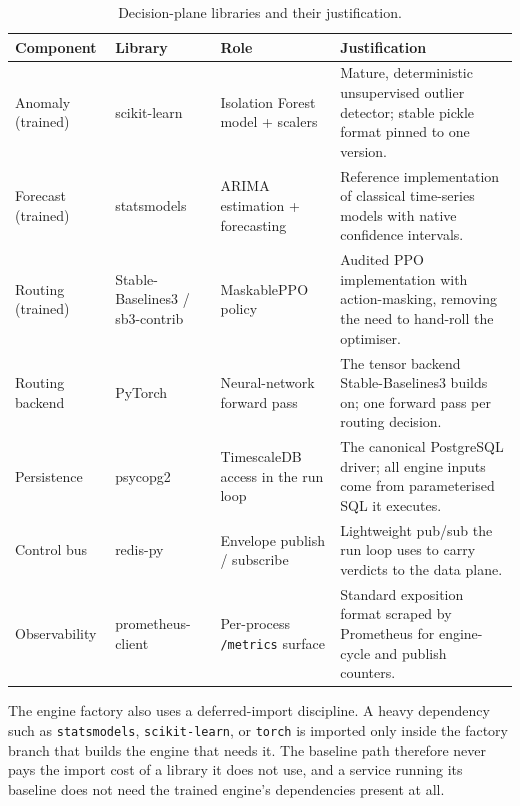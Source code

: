 \begin{table}[H]
  \centering
  \caption[Decision-plane libraries and their justification]{Decision-plane libraries and their justification.}
  \label{tab:imb:tooling}
  \small
  \begin{tabular}{@{}llp{3.0cm}p{4.4cm}@{}}
    \toprule
    \textbf{Component} & \textbf{Library} & \textbf{Role} & \textbf{Justification} \\
    \midrule
    Anomaly (trained)  & scikit-learn        & Isolation Forest model + scalers
      & Mature, deterministic unsupervised outlier detector; stable pickle format pinned to one version. \\
    Forecast (trained) & statsmodels         & ARIMA estimation + forecasting \cite{box2015timeseries}
      & Reference implementation of classical time-series models with native confidence intervals. \\
    Routing (trained)  & Stable-Baselines3 / sb3-contrib & MaskablePPO policy \cite{schulman2017ppo, raffin2021sb3}
      & Audited PPO implementation with action-masking, removing the need to hand-roll the optimiser. \\
    Routing backend    & PyTorch             & Neural-network forward pass
      & The tensor backend Stable-Baselines3 builds on; one forward pass per routing decision. \\
    Persistence        & psycopg2            & TimescaleDB access in the run loop
      & The canonical PostgreSQL driver; all engine inputs come from parameterised SQL it executes. \\
    Control bus        & redis-py            & Envelope publish / subscribe
      & Lightweight pub/sub the run loop uses to carry verdicts to the data plane. \\
    Observability      & prometheus-client   & Per-process \texttt{/metrics} surface \cite{prometheus}
      & Standard exposition format scraped by Prometheus for engine-cycle and publish counters. \\
    \bottomrule
  \end{tabular}
\end{table}

The engine factory also uses a deferred-import discipline. A heavy dependency such
as \texttt{statsmodels}, \texttt{scikit-learn}, or \texttt{torch} is imported only
inside the factory branch that builds the engine that needs it. The baseline path
therefore never pays the import cost of a library it does not use, and a service
running its baseline does not need the trained engine's dependencies present at
all.

